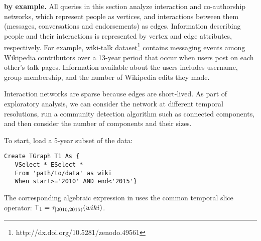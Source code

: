 {\bf \ql by example.}  All queries in this section analyze interaction
and co-authorship networks, which represent people as vertices, and
interactions between them (messages, conversations and endorsements)
as edges.  Information describing people and their interactions is
represented by vertex and edge attributes, respectively. For example,
wiki-talk dataset\footnote{http://dx.doi.org/10.5281/zenodo.49561}
contains messaging events among Wikipedia contributors over a 13-year
period that occur when users post on each other's talk pages.
Information available about the users includes username, group
membership, and the number of Wikipedia edits they made.

Interaction networks are sparse because edges are short-lived.  As
part of exploratory analysis, we can consider the network at different
temporal resolutions, run a community detection algorithm such as
connected components, and then consider the number of
components and their sizes.




\begin{example}
\vspace{-0.1cm}
\label{ex:slice}
To start, load a 5-year subset of the data:
\begin{small}
\begin{verbatim}
Create TGraph T1 As {
   VSelect * ESelect *  
   From 'path/to/data' as wiki
   When start>='2010' AND end<'2015'}
\end{verbatim}
\vspace{-0.1cm}
\end{small}

The corresponding algebraic expression in \tga uses the common
temporal slice operator: $\mathsf{T}_1 = \tau_{[2010, 2015)}(wiki)$.

\vspace{-0.3cm}
\end{example}

